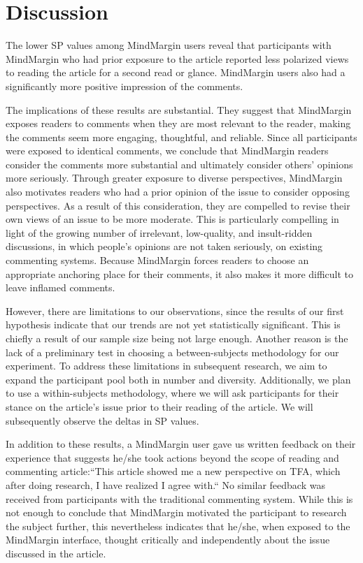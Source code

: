 \section{Discussion}

The lower SP values among MindMargin users reveal that participants with MindMargin who had prior exposure to the article reported less polarized views to reading the article for a second read or glance. MindMargin users also had a significantly more positive impression of the comments. 

The implications of these results are substantial. They suggest that MindMargin exposes readers to comments when they are most relevant to the reader, making the comments seem more engaging, thoughtful, and reliable. Since all participants were exposed to identical comments, we conclude that MindMargin readers consider the comments more substantial and ultimately consider others' opinions more seriously. Through greater exposure to diverse perspectives, MindMargin also motivates readers who had a prior opinion of the issue to consider opposing perspectives. As a result of this consideration, they are compelled to revise their own views of an issue to be more moderate. This is particularly compelling in light of the growing number of irrelevant, low-quality, and insult-ridden discussions, in which people's opinions are not taken seriously, on existing commenting systems. Because MindMargin  forces readers to choose an appropriate anchoring place for their comments, it also makes it more difficult to leave inflamed comments. 

However, there are limitations to our observations, since the results of our first hypothesis indicate that our trends are not yet statistically significant. This is chiefly a result of our sample size being not large enough. Another reason is the lack of a preliminary test in choosing a between-subjects methodology for our experiment. To address these limitations in subsequent research, we aim to expand the participant pool both in number and diversity. Additionally, we plan to use a within-subjects methodology, where we will ask participants for their stance on the article's issue prior to their reading of the article. We will subsequently observe the deltas in SP values.

In addition to these results, a MindMargin user gave us written feedback on their experience that suggests he/she took actions beyond the scope of reading and commenting article:``This article showed me a new perspective on TFA, which after doing research, I have realized I agree with.`` No similar feedback was received from participants with the traditional commenting system. While this is not enough to conclude that MindMargin motivated the participant to research the subject further, this nevertheless indicates that he/she, when exposed to the MindMargin interface, thought critically and independently about the issue discussed in the article.